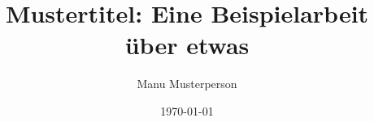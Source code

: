 \documentclass[]{thesis}
\author{Manu Musterperson}
\title{Mustertitel: Eine Beispielarbeit über etwas}
\date{\today}
\begin{document}
{
\frontmatter
\maketitle

\makedeclaration

\begin{abstract}
    \blindtext
\end{abstract}

\begin{acknowledgements}
    \blindtext
\end{acknowledgements}

{
\tableofcontents
}
}

{
\mainmatter





}

{
\backmatter
\nocite{*} %
\printbibliography[heading=bibintoc]
}

\appendix


\end{document}
